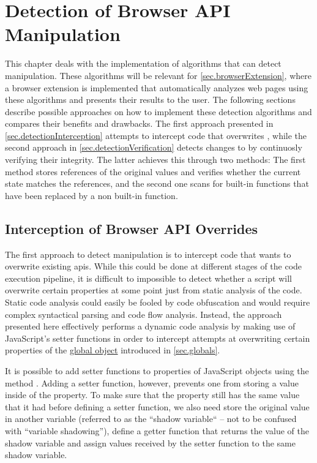 \chapter{Detection of Browser API Manipulation}
\label{sec.detection}

This chapter deals with the implementation of algorithms that can detect \browserAPI{} manipulation. These algorithms will be relevant for \autoref{sec.browserExtension}, where a browser extension is implemented that automatically analyzes web pages using these algorithms and presents their results to the user. The following sections describe possible approaches on how to implement these detection algorithms and compares their benefits and drawbacks. The first approach presented in \autoref{sec.detectionInterception} attempts to intercept code that overwrites \browserAPIs{}, while the second approach in \autoref{sec.detectionVerification} detects changes to \browserAPIs{} by continuosly verifying their integrity. The latter achieves this through two methods: The first method stores references of the original values and verifies whether the current state matches the references, and the second one scans \browserAPIs{} for built-in functions that have been replaced by a non built-in function.



\section{Interception of Browser API Overrides}
\label{sec.detectionInterception}

The first approach to detect \browserAPI{} manipulation is to intercept code that wants to overwrite existing \acp{api}. While this could be done at different stages of the code execution pipeline, it is difficult to impossible to detect whether a script will overwrite certain properties at some point just from static analysis of the code. Static code analysis could easily be fooled by code obfuscation and would require complex syntactical parsing and code flow analysis. Instead, the approach presented here effectively performs a dynamic code analysis by making use of JavaScript's setter functions in order to intercept attempts at overwriting certain properties of the \hyperref[sec.globals]{global object} introduced in \autoref{sec.globals}.

It is possible to add setter functions to properties of JavaScript objects using the method . Adding a setter function, however, prevents one from storing a value inside of the property. To make sure that the property still has the same value that it had before defining a setter function, we also need store the original value in another variable (referred to as the “shadow variable“ – not to be confused with “variable shadowing”), define a getter function that returns the value of the shadow variable and assign values received by the setter function to the same shadow variable. \cite{MozObjectDefineProperty}

